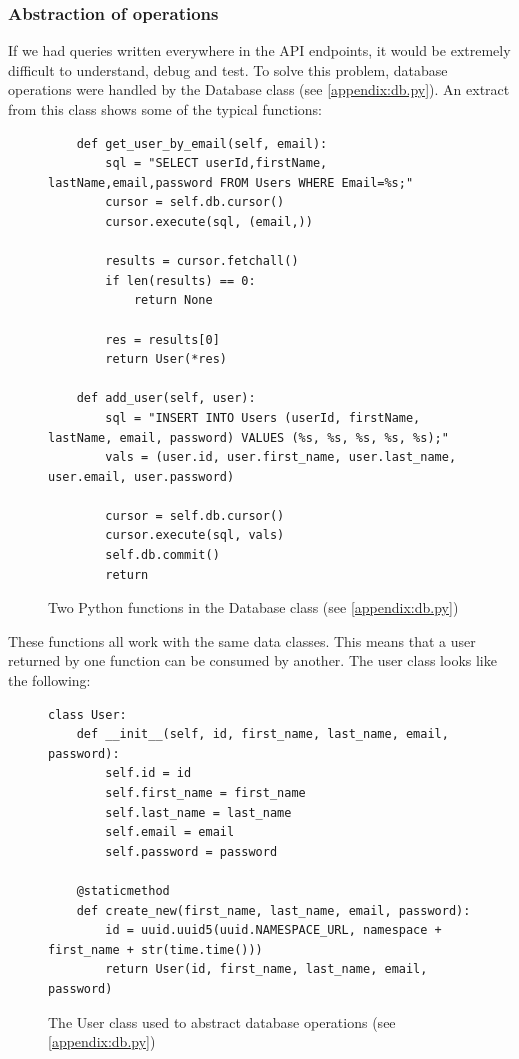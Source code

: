 \documentclass[12pt, letterpaper]{article}
\begin{document}
\subsubsection{Abstraction of operations}\label{sec:abstraction-of-operations}

\begin{flushleft}
If we had queries written everywhere in the API endpoints, it would be extremely difficult to understand, debug and test. To solve this problem, database operations were handled by the Database class (see \ref{appendix:db.py}). An extract from this class shows some of the typical functions:
\end{flushleft}

\begin{flushleft}
\begin{figure}[H]
\begin{verbatim}
    def get_user_by_email(self, email):
        sql = "SELECT userId,firstName, lastName,email,password FROM Users WHERE Email=%s;"
        cursor = self.db.cursor()
        cursor.execute(sql, (email,))

        results = cursor.fetchall()
        if len(results) == 0:
            return None

        res = results[0]
        return User(*res)

    def add_user(self, user):
        sql = "INSERT INTO Users (userId, firstName, lastName, email, password) VALUES (%s, %s, %s, %s, %s);"
        vals = (user.id, user.first_name, user.last_name, user.email, user.password)

        cursor = self.db.cursor()
        cursor.execute(sql, vals)
        self.db.commit()
        return
\end{verbatim}
\caption{Two Python functions in the Database class (see \ref{appendix:db.py})}
\end{figure}
\end{flushleft}

These functions all work with the same data classes. This means that a user returned by one function can be consumed by another. The user class looks like the following:

\begin{flushleft}
\begin{figure}[H]
\begin{verbatim}
class User:
    def __init__(self, id, first_name, last_name, email, password):
        self.id = id
        self.first_name = first_name
        self.last_name = last_name
        self.email = email
        self.password = password

    @staticmethod
    def create_new(first_name, last_name, email, password):
        id = uuid.uuid5(uuid.NAMESPACE_URL, namespace + first_name + str(time.time()))
        return User(id, first_name, last_name, email, password)
\end{verbatim}
\caption{The User class used to abstract database operations (see \ref{appendix:db.py})}
\end{figure}
\end{flushleft}
\end{document}

